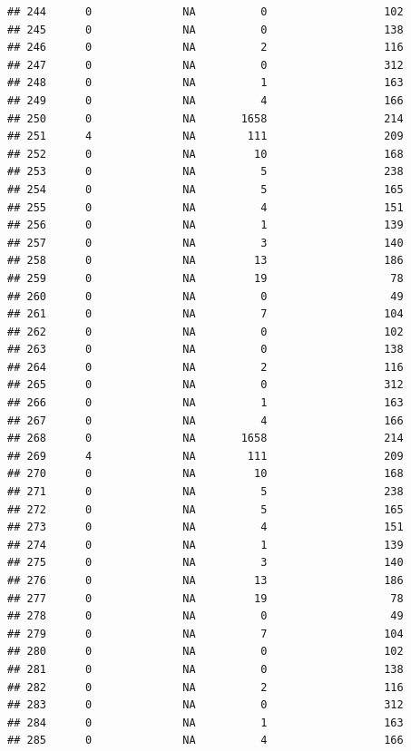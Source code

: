 \documentclass[
]{article}
\begin{document}
\begin{verbatim}
## 244      0              NA          0                  102
## 245      0              NA          0                  138
## 246      0              NA          2                  116
## 247      0              NA          0                  312
## 248      0              NA          1                  163
## 249      0              NA          4                  166
## 250      0              NA       1658                  214
## 251      4              NA        111                  209
## 252      0              NA         10                  168
## 253      0              NA          5                  238
## 254      0              NA          5                  165
## 255      0              NA          4                  151
## 256      0              NA          1                  139
## 257      0              NA          3                  140
## 258      0              NA         13                  186
## 259      0              NA         19                   78
## 260      0              NA          0                   49
## 261      0              NA          7                  104
## 262      0              NA          0                  102
## 263      0              NA          0                  138
## 264      0              NA          2                  116
## 265      0              NA          0                  312
## 266      0              NA          1                  163
## 267      0              NA          4                  166
## 268      0              NA       1658                  214
## 269      4              NA        111                  209
## 270      0              NA         10                  168
## 271      0              NA          5                  238
## 272      0              NA          5                  165
## 273      0              NA          4                  151
## 274      0              NA          1                  139
## 275      0              NA          3                  140
## 276      0              NA         13                  186
## 277      0              NA         19                   78
## 278      0              NA          0                   49
## 279      0              NA          7                  104
## 280      0              NA          0                  102
## 281      0              NA          0                  138
## 282      0              NA          2                  116
## 283      0              NA          0                  312
## 284      0              NA          1                  163
## 285      0              NA          4                  166

\end{verbatim}
\end{document}
